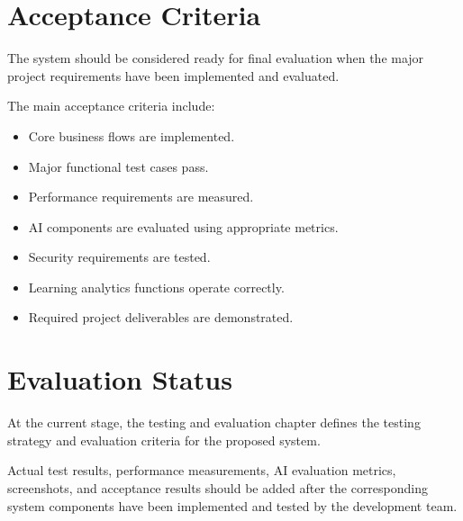 \section{Acceptance Criteria}

The system should be considered ready for final evaluation when the major project requirements have been implemented and evaluated.

The main acceptance criteria include:

\begin{itemize}
	\item Core business flows are implemented.
	\item Major functional test cases pass.
	\item Performance requirements are measured.
	\item AI components are evaluated using appropriate metrics.
	\item Security requirements are tested.
	\item Learning analytics functions operate correctly.
	\item Required project deliverables are demonstrated.
\end{itemize}

\section{Evaluation Status}

At the current stage, the testing and evaluation chapter defines the testing strategy and evaluation criteria for the proposed system.

Actual test results, performance measurements, AI evaluation metrics, screenshots, and acceptance results should be added after the corresponding system components have been implemented and tested by the development team.